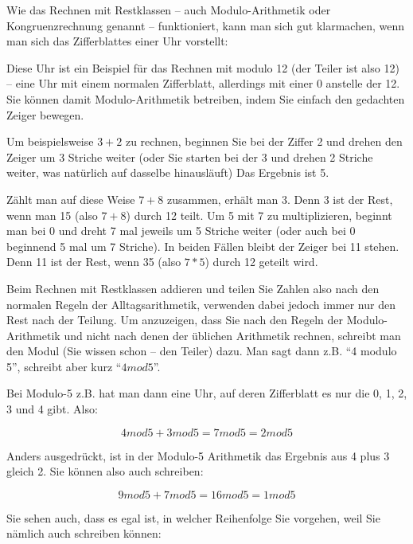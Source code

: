\documentclass[a4paper,11pt, oneside,openright,titlepage,dvips]{scrbook}
\newcommand{\IncludeImage}[2][]{\texorhtml{%
\texttt{[image: \#2]}%
}{%
\htmlimg{#2.png}%
}}
\newcommand{\bmod}{mod}
\begin{document}
Wie das Rechnen mit Restklassen -- auch Modulo-Arithmetik oder
Kongruenzrechnung genannt -- funktioniert, kann man sich gut
klarmachen, wenn man sich das Zifferblattes einer Uhr vorstellt:

\begin{center}
\IncludeImage[width=0.25\textwidth]{clock-face}
\end{center}

Diese Uhr ist ein Beispiel für das Rechnen mit modulo 12 (der Teiler
ist also 12) -- eine Uhr mit einem normalen Zifferblatt, allerdings
mit einer 0 anstelle der 12. Sie können damit Modulo-Arithmetik
betreiben, indem Sie einfach den gedachten Zeiger bewegen.

Um beispielsweise $3 + 2$ zu rechnen, beginnen Sie bei der Ziffer 2
und drehen den Zeiger um 3 Striche weiter (oder Sie starten bei der 3
und drehen 2 Striche weiter, was natürlich auf dasselbe hinausläuft)
Das Ergebnis ist 5.

Zählt man auf diese Weise $7 + 8$ zusammen, erhält man 3. Denn 3 ist
der Rest, wenn man 15 (also $7 + 8$) durch 12 teilt.  Um 5 mit 7 zu
multiplizieren, beginnt man bei 0 und dreht 7 mal jeweils um 5 Striche
weiter (oder auch bei 0 beginnend 5 mal um 7 Striche). In beiden
Fällen bleibt der Zeiger bei 11 stehen. Denn 11 ist der Rest, wenn 35
(also $7 * 5$) durch 12 geteilt wird.

\clearpage

Beim Rechnen mit Restklassen addieren und teilen Sie Zahlen also nach
den normalen Regeln der Alltagsarithmetik, verwenden dabei jedoch
immer nur den Rest nach der Teilung. Um anzuzeigen, dass Sie nach den
Regeln der Modulo-Arithmetik und nicht nach denen der üblichen
Arithmetik rechnen, schreibt man den Modul (Sie wissen schon -- den
Teiler) dazu. Man sagt dann z.B. "`4 modulo 5"',
schreibt aber kurz "`$4 \bmod 5$"'. 

Bei Modulo-5 z.B. hat man dann eine Uhr, auf deren
Zifferblatt es nur die 0, 1, 2, 3 und 4 gibt. Also:

\[ 4 \bmod 5 + 3 \bmod 5 = 7 \bmod 5 = 2 \bmod 5 \]

Anders ausgedrückt, ist in der Modulo-5 Arithmetik das Ergebnis
aus 4 plus 3 gleich 2. Sie können also auch schreiben:

\[ 9 \bmod 5 + 7 \bmod 5 = 16 \bmod 5 = 1 \bmod 5 \]

Sie sehen auch, dass es egal ist, in welcher Reihenfolge Sie
vorgehen, weil Sie nämlich auch schreiben können:
\end{document}
